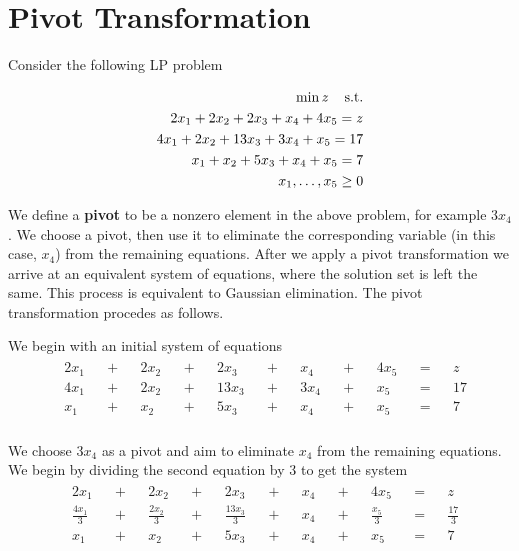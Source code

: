 \section{Pivot Transformation}
Consider the following LP problem

\begin{equation}
    \begin{split}
        \min z \hspace{4mm}\text{s.t.} \\
        2 x_1 + 2 x_2 + 2 x_3 + x_4 + 4 x_5 = z \\
        4 x_1 + 2 x_2 + 13 x_3 + 3 x_4 + x_5 = 17 \\
        x_1 + x_2 + 5 x_3 + x_4 + x_5 = 7 \\
        x_1, \ldots, x_5 \geq 0
    \end{split}
\end{equation}

We define a \textbf{pivot} to be a nonzero element in the above problem, for example
$3x_4$. We choose a pivot, then use it to eliminate the corresponding variable
(in this case, $x_4$) from the remaining equations. After we apply a pivot
transformation we arrive at an equivalent system of equations, where the
solution set is left the same. This process is equivalent to Gaussian
elimination. The pivot transformation procedes as follows.

We begin with an initial system of equations
\begin{eqnarray}
    \label{example01}
    \begin{aligned}
        && 2x_1 &&+&& 2x_2 &&+&& 2x_3 &&+&& x_4 &&+&& 4x_5 &&=&& z& \\
        && 4x_1 &&+&& 2x_2 &&+&& 13x_3 &&+&& 3x_4 &&+&& x_5 &&=&& 17& \\
        &&  x_1 &&+&& x_2 &&+&& 5x_3 &&+&& x_4 &&+&& x_5 &&=&& 7& \\
    \end{aligned}
\end{eqnarray}

We choose $3x_4$ as a pivot and aim to eliminate $x_4$ from the remaining equations. We begin by dividing the second equation by $3$ to get the system
\begin{eqnarray}
    \label{example01}
    \begin{aligned}
        && 2x_1 &&+&& 2x_2 &&+&& 2x_3 &&+&& x_4 &&+&& 4x_5 &&=&& z& \\
        && \frac{4x_1}{3} &&+&& \frac{2x_2}{3} &&+&& \frac{13x_3}{3} &&+&& x_4
            &&+&& \frac{x_5}{3} &&=&& \frac{17}{3}& \\
        &&  x_1 &&+&& x_2 &&+&& 5x_3 &&+&& x_4 &&+&& x_5 &&=&& 7& \\
    \end{aligned}
\end{eqnarray}

